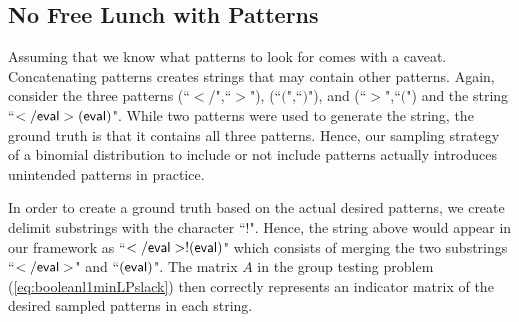 \subsection{No Free Lunch with Patterns}
Assuming that we know what patterns to look for comes with a caveat. Concatenating patterns creates strings that may contain other patterns. Again, consider the three patterns (``$<$/",``$>$"), (``$($",``$)$"), and (``$>$",``$($") and the string  ``$\sf{</eval>(eval)}$". While two patterns were used to generate the string, the ground truth is that it contains all three patterns. Hence, our sampling strategy of a binomial distribution to include or not include patterns actually introduces unintended patterns in practice. 

In order to create a ground truth based on the actual desired patterns, we create delimit substrings with the character ``$!$".  Hence, the string above would appear in our framework as 
``$\sf{</eval>!(eval)}$" which consists of merging the two substrings ``$\sf{</eval>}$" and ``$\sf{(eval)}$". The matrix $A$ in the group testing problem (\ref{eq:booleanl1minLPslack}) then correctly represents an indicator matrix of the desired sampled patterns in each string.

